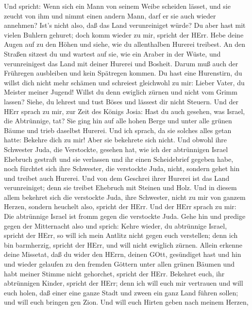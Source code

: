  Und spricht: Wenn sich ein Mann von seinem Weibe scheiden
lässet, und sie zeucht von ihm und nimmt einen andern Mann, darf er sie
auch wieder annehmen? Ist's nicht also, daß das Land verunreiniget
würde? Du aber hast mit vielen Buhlern gehuret; doch komm wieder zu mir,
spricht der HErr.  Hebe deine Augen auf zu den Höhen und
siehe, wie du allenthalben Hurerei treibest. An den Straßen sitzest du
und wartest auf sie, wie ein Araber in der Wüste, und verunreinigest das
Land mit deiner Hurerei und Bosheit.  Darum muß auch der
Frühregen ausbleiben und kein Spätregen kommen. Du hast eine Hurenstirn,
du willst dich nicht mehr schämen  und schreiest gleichwohl
zu mir: Lieber Vater, du Meister meiner Jugend!  Willst du
denn ewiglich zürnen und nicht vom Grimm lassen? Siehe, du lehrest und
tust Böses und lässest dir nicht Steuern.  Und der HErr
sprach zu mir, zur Zeit des Königs Josia: Hast du auch gesehen, was
Israel, die Abtrünnige, tat? Sie ging hin auf alle hohen Berge und unter
alle grünen Bäume und trieb daselbst Hurerei.  Und ich
sprach, da sie solches alles getan hatte: Bekehre dich zu mir! Aber sie
bekehrete sich nicht. Und obwohl ihre Schwester Juda, die Verstockte,
gesehen hat,  wie ich der abtrünnigen Israel Ehebruch
gestraft und sie verlassen und ihr einen Scheidebrief gegeben habe, noch
fürchtet sich ihre Schwester, die verstockte Juda, nicht, sondern gehet
hin und treibet auch Hurerei.  Und von dem Geschrei ihrer
Hurerei ist das Land verunreiniget; denn sie treibet Ehebruch mit
Steinen und Holz.  Und in diesem allem bekehret sich die
verstockte Juda, ihre Schwester, nicht zu mir von ganzem Herzen, sondern
heuchelt also, spricht der HErr.  Und der HErr sprach zu
mir: Die abtrünnige Israel ist fromm gegen die verstockte Juda.
 Gehe hin und predige gegen der Mitternacht also und
sprich: Kehre wieder, du abtrünnige Israel, spricht der HErr, so will
ich mein Antlitz nicht gegen euch verstellen; denn ich bin barmherzig,
spricht der HErr, und will nicht ewiglich zürnen.  Allein
erkenne deine Missetat, daß du wider den HErrn, deinen GOtt, gesündiget
hast und hin und wieder gelaufen zu den fremden Göttern unter allen
grünen Bäumen und habt meiner Stimme nicht gehorchet, spricht der HErr.
 Bekehret euch, ihr abtrünnigen Kinder, spricht der HErr;
denn ich will euch mir vertrauen und will euch holen, daß einer eine
ganze Stadt und zween ein ganz Land führen sollen; und will euch bringen
gen Zion.  Und will euch Hirten geben nach meinem Herzen,
